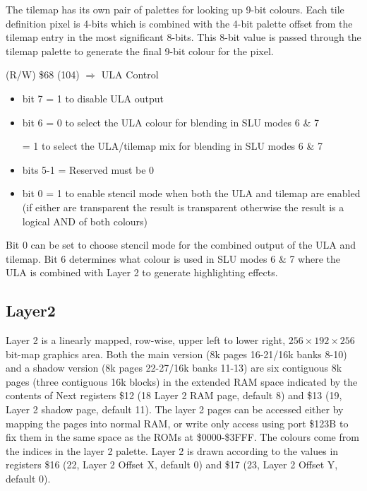 The tilemap has its own pair of palettes for looking up 9-bit colours.  Each 
tile definition pixel is 4-bits which is combined with the 4-bit palette offset
from the tilemap entry in the most significant 8-bits.  This 8-bit value is 
passed through the tilemap palette to generate the final 9-bit colour for the 
pixel.

(R/W) \$68 (104) $\Rightarrow$ ULA Control
\begin{itemize}
\item bit 7 = 1 to disable ULA output
\item bit 6 = 0 to select the ULA colour for blending in SLU modes 6 \& 7
  
  = 1 to select the ULA/tilemap mix for blending in SLU modes 6 \& 7
\item bits 5-1 = Reserved must be 0
\item bit 0 = 1 to enable stencil mode when both the ULA and tilemap
  are enabled (if either are transparent the result is transparent
  otherwise the result is a logical AND of both colours)
\end{itemize}

Bit 0 can be set to choose stencil mode for the combined output of the
ULA and tilemap.  Bit 6 determines what colour is used in SLU modes 6
\& 7 where the ULA is combined with Layer 2 to generate highlighting
effects.

\subsection{Layer2}
Layer 2 is a linearly mapped, row-wise, upper left to lower right,
$256\times192\times256$ bit-map graphics area.  Both the main version
(8k pages 16-21/16k banks 8-10) and a shadow version (8k pages
22-27/16k banks 11-13) are six contiguous 8k pages (three contiguous
16k blocks) in the extended RAM space indicated by the contents of
Next registers \$12 (18 Layer 2 RAM page, default 8) and \$13 (19,
Layer 2 shadow page, default 11).  The layer 2 pages can be accessed
either by mapping the pages into normal RAM, or write only access
using port \$123B to fix them in the same space as the ROMs at
\$0000-\$3FFF.  The colours come from the indices in the layer 2
palette.  Layer 2 is drawn according to the values in registers \$16
(22, Layer 2 Offset X, default 0) and \$17 (23, Layer 2 Offset Y,
default 0).

